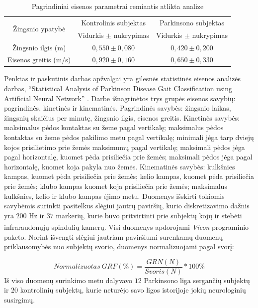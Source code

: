 \documentclass[]{vgtuef}
\begin{document}

\begin{table}
	\centering
	\renewcommand{\arraystretch}{1.3}
	\caption{Pagrindiniai eisenos parametrai remiantis atlikta analize \cite{6151536}}
	\label{table:statistics_st_wa}
	\begin{tabular}{|c|c|c|} \hline
		\multirow{2}{*}{Žingsnio ypatybė} & Kontrolinis subjektas & Parkinsono subjektas \\ \cline{2-3}
			& Vidurkis $\pm$ nukrypimas & Vidurkis $\pm$ nukrypimas \\ \hline
		Žingsnio ilgis (m)    & $0,550\pm0,080$ & $0,420\pm0,200$ \\ \hline
		Eisenos greitis (m/s) & $0,920\pm0,160$ & $0,650\pm0,330$ \\ \hline
	\end{tabular}
\end{table}

Penktas ir paskutinis darbas apžvalgai yra gilesnės statistinės eisenos analizės darbas, ``Statistical Analysis of Parkinson Disease Gait Classification using Artificial Neural Network'' \cite{6151536}. Darbe išnagrinėtos trys grupės eisenos savybių: pagrindinės, kinetinės ir kinematinės. Pagrindinės savybės: žingsnio laikas, žingsnių skaičius per minutę, žingsnio ilgis, eisenos greitis. Kinetinės savybės: maksimalus pėdos kontaktas su žeme pagal vertikalę; maksimalus pėdos kontaktas su žeme pėdos pakilimo metu pagal vertikalę; minimali jėga tarp dviejų kojos prisilietimo prie žemės maksimumų pagal vertikalę; maksimali pėdos jėga pagal horizontalę, kuomet pėda prisiliečia prie žemės; maksimali pėdos jėga pagal horizontalę, kuomet koja pakyla nuo žemės. Kinematinės savybės: kulkšnies kampas, kuomet pėda prisiliečia prie žemės; kelio kampas, kuomet pėda prisiliečia prie žemės; klubo kampas kuomet koja prisiliečia prie žemės; maksimalus kulkšnies, kelio ir klubo kampas ėjimo metu. Duomenys išskirti tokiomis savybėmis surinkti pasitelkus slėgiui jautrų paviršių, kurio diskretizavimo dažnis yra $200$ Hz ir $37$ markerių, kurie buvo pritvirtinti prie subjektų kojų ir stebėti infraraudonųjų spindulių kamerų. Visi duomenys apdorojami \textit{Vicon\textsuperscript{\textregistered}} programinio paketo. Norint išvengti slėgiui jautriam paviršiumi surenkamų duomenų priklausomybės nuo subjektų svorio, duomenys normalizuojami pagal svorį:

\begin{equation}
Normalizuotas~GRF(\%) = \frac{GRN(N)}{Svoris (N)} * 100\%
\end{equation}
Iš viso duomenų surinkimo metu dalyvavo $12$ Parkinsono liga sergančių subjektų ir $20$ kontrolinių subjektų, kurie neturėjo savo ligos istorijoje jokių neurologinių susirgimų.
\end{document}
